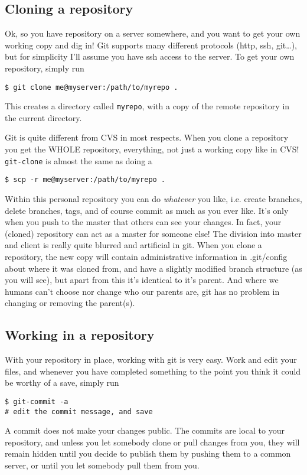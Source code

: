 \documentclass[a4paper,10pt]{article}
\begin{document}
\subsection{Cloning a repository}
Ok, so you have repository on a server somewhere, and you want to get your own
working copy and dig in! Git supports many different protocols (http, ssh,
git\ldots), but for simplicity I'll assume you have ssh access to the server.
To get your own repository, simply run
\begin{verbatim}
$ git clone me@myserver:/path/to/myrepo .
\end{verbatim}
This creates a directory called \texttt{myrepo}, with a copy of the remote
repository in the current directory.

Git is quite different from CVS in most respects. When you clone a repository
you get the WHOLE repository, everything, not just a working copy like in CVS!
\texttt{git-clone} is almost the same as doing a
\begin{verbatim}
$ scp -r me@myserver:/path/to/myrepo .
\end{verbatim}
Within this personal repository you can do \textit{whatever} you like, i.e.
create branches, delete branches, tags, and of course commit as much as you
ever like. It's only when you push to the master that others can see your
changes.  In fact, your (cloned) repository can act as a master for someone
else! The division into master and client is really quite blurred and
artificial in git.  When you clone a repository, the new copy will contain
administrative information in .git/config about where it was cloned from, and
have a slightly modified branch structure (as you will see), but apart from
this it's identical to it's parent. And where we humans can't choose nor
change who our parents are, git has no problem in changing or removing the
parent(s).

\subsection{Working in a repository}
With your repository in place, working with git is very easy. Work and edit
your files, and whenever you have completed something to the point you think
it could be worthy of a save, simply run
\begin{verbatim}
$ git-commit -a
# edit the commit message, and save
\end{verbatim}
A commit does not make your changes public. The commits are local to your
repository, and unless you let somebody clone or pull changes from you,
they will remain hidden until you decide to publish them by pushing them
to a common server, or until you let somebody pull them from you.
\end{document}
